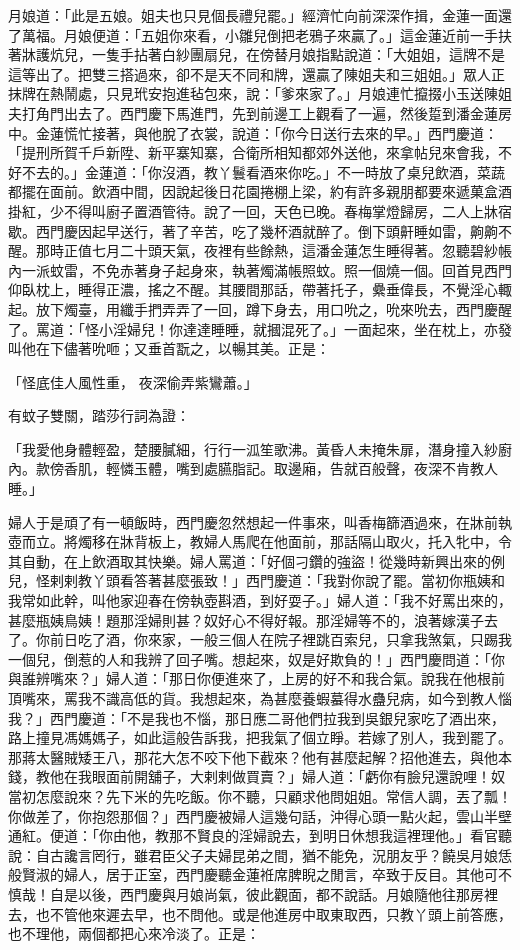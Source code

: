 \begin{showcontents}{}
月娘道：「此是五娘。姐夫也只見個長禮兒罷。」經濟忙向前深深作揖，金蓮一面還了萬福。月娘便道：「五姐你來看，小雛兒倒把老鴉子來贏了。」這金蓮近前一手扶著牀護炕兒，一隻手拈著白紗團扇兒，在傍替月娘指點說道：「大姐姐，這牌不是這等出了。把雙三搭過來，卻不是天不同和牌，還贏了陳姐夫和三姐姐。」眾人正抹牌在熱鬧處，只見玳安抱進毡包來，說：「爹來家了。」月娘連忙攛掇小玉送陳姐夫打角門出去了。西門慶下馬進門，先到前邊工上觀看了一遍，然後踅到潘金蓮房中。金蓮慌忙接著，與他脫了衣裳，說道：「你今日送行去來的早。」西門慶道：「提刑所賀千戶新陞、新平寨知寨，合衛所相知都郊外送他，來拿帖兒來會我，不好不去的。」金蓮道：「你沒酒，教丫鬟看酒來你吃。」不一時放了桌兒飲酒，菜蔬都擺在面前。飲酒中間，因說起後日花園捲棚上梁，約有許多親朋都要來遞菓盒酒掛紅，少不得叫廚子置酒管待。說了一回，天色已晚。春梅掌燈歸房，二人上牀宿歇。西門慶因起早送行，著了辛苦，吃了幾杯酒就醉了。倒下頭鼾睡如雷，齁齁不醒。那時正值七月二十頭天氣，夜裡有些餘熱，這潘金蓮怎生睡得著。忽聽碧紗帳內一派蚊雷，不免赤著身子起身來，執著燭滿帳照蚊。照一個燒一個。回首見西門仰臥枕上，睡得正濃，搖之不醒。其腰間那話，帶著托子，纍垂偉長，不覺淫心輙起。放下燭臺，用纖手捫弄弄了一回，蹲下身去，用口吮之，吮來吮去，西門慶醒了。罵道：「怪小淫婦兒！你達達睡睡，就摑混死了。」一面起來，坐在枕上，亦發叫他在下儘著吮咂；又垂首翫之，以暢其美。正是：

「怪底佳人風性重，  夜深偷弄紫鸞蕭。」

有蚊子雙關，踏莎行詞為證：

「我愛他身體輕盈，楚腰膩細，行行一泒笙歌沸。黃昏人未掩朱扉，潛身撞入紗廚內。款傍香肌，輕憐玉體，嘴到處臙脂記。取邊廂，告就百般聲，夜深不肯教人睡。」

婦人于是頑了有一頓飯時，西門慶忽然想起一件事來，叫香梅篩酒過來，在牀前執壺而立。將燭移在牀背板上，教婦人馬爬在他面前，那話隔山取火，托入牝中，令其自動，在上飲酒取其快樂。婦人罵道：「好個刁鑽的強盜！從幾時新興出來的例兒，怪剌剌教丫頭看答著甚麼張致！」西門慶道：「我對你說了罷。當初你瓶姨和我常如此幹，叫他家迎春在傍執壺斟酒，到好耍子。」婦人道：「我不好罵出來的，甚麼瓶姨鳥姨！題那淫婦則甚？奴好心不得好報。那淫婦等不的，浪著嫁漢子去了。你前日吃了酒，你來家，一般三個人在院子裡跳百索兒，只拿我煞氣，只踢我一個兒，倒惹的人和我辨了回子嘴。想起來，奴是好欺負的！」西門慶問道：「你與誰辨嘴來？」婦人道：「那日你便進來了，上房的好不和我合氣。說我在他根前頂嘴來，罵我不識高低的貨。我想起來，為甚麼養蝦蟇得水蠱兒病，如今到教人惱我？」西門慶道：「不是我也不惱，那日應二哥他們拉我到吳銀兒家吃了酒出來，路上撞見馮媽媽子，如此這般告訴我，把我氣了個立睜。若嫁了別人，我到罷了。那蔣太醫賊矮王八，那花大怎不咬下他下截來？他有甚麼起解？招他進去，與他本錢，教他在我眼面前開舖子，大剌剌做買賣？」婦人道：「虧你有臉兒還說哩！奴當初怎麼說來？先下米的先吃飯。你不聽，只顧求他問姐姐。常信人調，丟了瓢！你做差了，你抱怨那個？」西門慶被婦人這幾句話，沖得心頭一點火起，雲山半壁通紅。便道：「你由他，教那不賢良的淫婦說去，到明日休想我這裡理他。」看官聽說：自古讒言罔行，雖君臣父子夫婦昆弟之間，猶不能免，況朋友乎？饒吳月娘恁般賢淑的婦人，居于正室，西門慶聽金蓮袵席脾睨之閒言，卒致于反目。其他可不慎哉！自是以後，西門慶與月娘尚氣，彼此觀面，都不說話。月娘隨他往那房裡去，也不管他來遲去早，也不問他。或是他進房中取東取西，只教丫頭上前答應，也不理他，兩個都把心來冷淡了。正是：


\end{showcontents}
